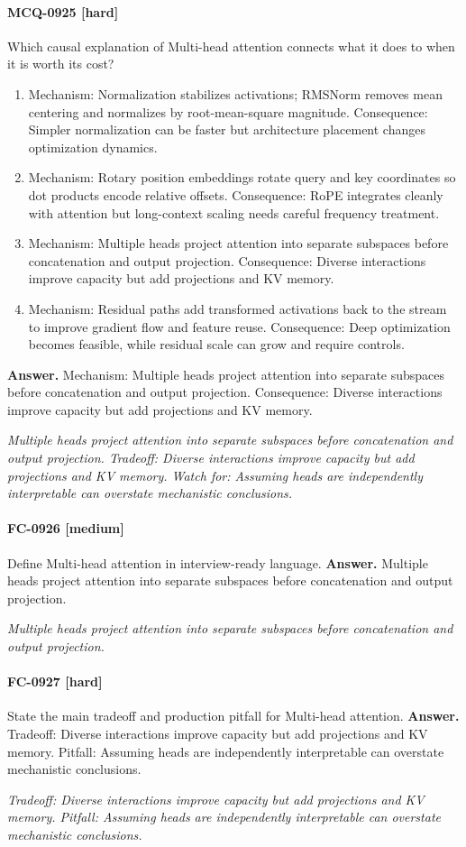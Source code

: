 \paragraph{MCQ-0925 [hard]} Which causal explanation of Multi-head attention connects what it does to when it is worth its cost?
\begin{enumerate}[label=\Alph*.]
\item Mechanism: Normalization stabilizes activations; RMSNorm removes mean centering and normalizes by root-mean-square magnitude. Consequence: Simpler normalization can be faster but architecture placement changes optimization dynamics.
\item Mechanism: Rotary position embeddings rotate query and key coordinates so dot products encode relative offsets. Consequence: RoPE integrates cleanly with attention but long-context scaling needs careful frequency treatment.
\item Mechanism: Multiple heads project attention into separate subspaces before concatenation and output projection. Consequence: Diverse interactions improve capacity but add projections and KV memory.
\item Mechanism: Residual paths add transformed activations back to the stream to improve gradient flow and feature reuse. Consequence: Deep optimization becomes feasible, while residual scale can grow and require controls.
\end{enumerate}
\noindent\textbf{Answer.} Mechanism: Multiple heads project attention into separate subspaces before concatenation and output projection. Consequence: Diverse interactions improve capacity but add projections and KV memory.
\par\textit{Multiple heads project attention into separate subspaces before concatenation and output projection. Tradeoff: Diverse interactions improve capacity but add projections and KV memory. Watch for: Assuming heads are independently interpretable can overstate mechanistic conclusions.}
\paragraph{FC-0926 [medium]} Define Multi-head attention in interview-ready language.
\noindent\textbf{Answer.} Multiple heads project attention into separate subspaces before concatenation and output projection.
\par\textit{Multiple heads project attention into separate subspaces before concatenation and output projection.}
\paragraph{FC-0927 [hard]} State the main tradeoff and production pitfall for Multi-head attention.
\noindent\textbf{Answer.} Tradeoff: Diverse interactions improve capacity but add projections and KV memory. Pitfall: Assuming heads are independently interpretable can overstate mechanistic conclusions.
\par\textit{Tradeoff: Diverse interactions improve capacity but add projections and KV memory. Pitfall: Assuming heads are independently interpretable can overstate mechanistic conclusions.}
